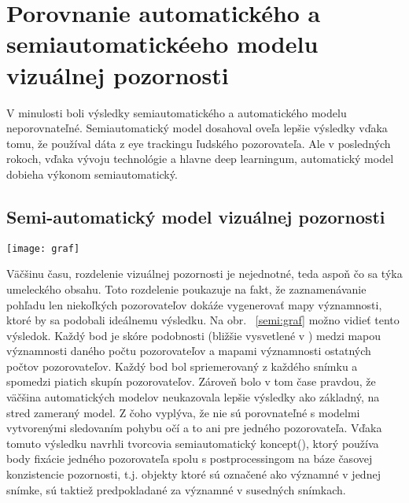 \documentclass[10pt,twoside,slovak,a4paper]{article}
\begin{document}
\section{Porovnanie automatického a semiautomatickéeho modelu vizuálnej pozornosti} \label{porovnanie}
V minulosti boli výsledky semiautomatického a automatického modelu neporovnateľné. Semiautomatický model dosahoval oveľa lepšie výsledky vďaka tomu, že používal dáta z eye trackingu ľudského pozorovateľa. Ale v posledných rokoch, vďaka vývoju technológie a hlavne deep learningum, automatický model dobieha výkonom semiautomatický.

\subsection{Semi-automatický model vizuálnej pozornosti} \label{semi-auto}
\begin{figure*}[tbh]
\centering
\texttt{[image: graf]}
\caption{poukazuje na vzťah medzi počtom pozorovateľov a presnosťou máp významnosti}
\label{semi:graf}
\end{figure*}
Väčšinu času, rozdelenie vizuálnej pozornosti je nejednotné, teda aspoň čo sa týka umeleckého obsahu. Toto rozdelenie poukazuje na fakt, že zaznamenávanie pohľadu len niekoľkých pozorovateľov dokáźe vygenerovať mapy významnosti, ktoré by sa podobali ideálnemu výsledku. Na obr. ~\ref{semi:graf} možno vidieť tento výsledok. Každý bod je skóre podobnosti (bližšie vysvetlené v \cite{Azam2016:sim}) medzi mapou významnosti daného počtu pozorovateľov a mapami významnosti ostatných počtov pozorovateľov. Každý bod bol spriemerovaný z každého snímku a spomedzi piatich skupín pozorovateľov. Zároveň bolo v tom čase pravdou, že väčšina automatických modelov neukazovala lepšie výsledky ako základný, na stred zameraný model. Z čoho vyplýva, že nie sú porovnateľné s modelmi vytvorenými sledovaním pohybu očí a to ani pre jedného pozorovateľa. Vďaka tomuto výsledku navrhli tvorcovia\cite{Coplien:MPD} semiautomatický koncept(), ktorý používa body fixácie jedného pozorovateľa spolu s postprocessingom na báze časovej konzistencie pozornosti, t.j. objekty ktoré sú označené ako významné v jednej snímke, sú taktiež predpokladané za významné v susedných snímkach.
\end{document}
